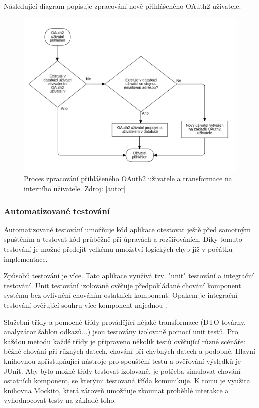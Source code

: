 			Následující diagram popisuje zpracování nově přihlášeného OAuth2 uživatele.

			\begin{figure}[H]
				\centering
				\includegraphics[width=\linewidth]{obrazky/proces_prihlaseni_oauth2}\hfill
				\caption{Proces zpracování přihlášeného OAuth2 uživatele a transformace na interního uživatele. Zdroj: [autor]}
			\end{figure}

		\subsubsection{Automatizované testování}

		Automatizované testování umožňuje kód aplikace otestovat ještě před samotným spuštěním a testovat
		kód průběžně při úpravách a rozšiřováních.
		Díky tomuto testování je možné předejít velkému množství logických chyb již v počátku implementace.

		Způsobů testování je více.
		Tato aplikace využívá tzv. "unit" testování a integrační testování.
		Unit testování izolovaně ověřuje předpokládané chování komponent systému bez ovlivnění chováním
		ostatních komponent\cite{unit_testing}.
		Opakem je integrační testování ověřující souhru více komponent najednou \cite{integration_testing}.

		Služební třídy a pomocné třídy provádějící nějaké transformace (\ac{DTO} továrny, analyzátor šablon odkazů...)
		jsou testovány izolovaně pomocí unit testů.
		Pro každou metodu každé třídy je připraveno několik testů ověřující různé scénáře: běžné chování při různých datech,
		chování při chybných datech a podobně.
		Hlavní knihovnou zpřístupňující nástroje pro spouštění testů a ověřování výsledků je JUnit.
		Aby bylo možné třídy testovat izolovaně, je potřeba simulovat chování ostatních komponent, se kterými testovaná
		třída komunikuje.
		K tomu je využita knihovna Mockito, která zároveň umožňuje zkoumat proběhlé interakce a vyhodnocovat testy
		na základě toho.

